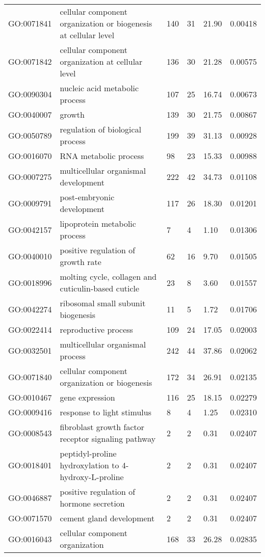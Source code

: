 \documentclass[10pt]{bmc_article}
\newenvironment{bmcformat}{\begin{raggedright}\baselineskip20pt\sloppy\setboolean{publ}{false}}{\end{raggedright}\baselineskip20pt\sloppy}
\begin{document}
\begin{bmcformat}
\begin{longtable}{lp{4.5cm}llll}
  GO:0071841 & cellular component organization or biogenesis at cellular level & 140 &  31 & 21.90 & 0.00418 \\ 
  GO:0071842 & cellular component organization at cellular level & 136 &  30 & 21.28 & 0.00575 \\ 
  GO:0090304 & nucleic acid metabolic process & 107 &  25 & 16.74 & 0.00673 \\ 
  GO:0040007 & growth & 139 &  30 & 21.75 & 0.00867 \\ 
  GO:0050789 & regulation of biological process & 199 &  39 & 31.13 & 0.00928 \\ 
  GO:0016070 & RNA metabolic process &  98 &  23 & 15.33 & 0.00988 \\ 
  GO:0007275 & multicellular organismal development & 222 &  42 & 34.73 & 0.01108 \\ 
  GO:0009791 & post-embryonic development & 117 &  26 & 18.30 & 0.01201 \\ 
  GO:0042157 & lipoprotein metabolic process &   7 &   4 & 1.10 & 0.01306 \\ 
  GO:0040010 & positive regulation of growth rate &  62 &  16 & 9.70 & 0.01505 \\ 
  GO:0018996 & molting cycle, collagen and cuticulin-based cuticle &  23 &   8 & 3.60 & 0.01557 \\ 
  GO:0042274 & ribosomal small subunit biogenesis &  11 &   5 & 1.72 & 0.01706 \\ 
  GO:0022414 & reproductive process & 109 &  24 & 17.05 & 0.02003 \\ 
  GO:0032501 & multicellular organismal process & 242 &  44 & 37.86 & 0.02062 \\ 
  GO:0071840 & cellular component organization or biogenesis & 172 &  34 & 26.91 & 0.02135 \\ 
  GO:0010467 & gene expression & 116 &  25 & 18.15 & 0.02279 \\ 
  GO:0009416 & response to light stimulus &   8 &   4 & 1.25 & 0.02310 \\ 
  GO:0008543 & fibroblast growth factor receptor signaling pathway &   2 &   2 & 0.31 & 0.02407 \\ 
  GO:0018401 & peptidyl-proline hydroxylation to 4-hydroxy-L-proline &   2 &   2 & 0.31 & 0.02407 \\ 
  GO:0046887 & positive regulation of hormone secretion &   2 &   2 & 0.31 & 0.02407 \\ 
  GO:0071570 & cement gland development &   2 &   2 & 0.31 & 0.02407 \\ 
  GO:0016043 & cellular component organization & 168 &  33 & 26.28 & 0.02835 \\ 

\end{longtable}
\end{bmcformat}
\end{document}

